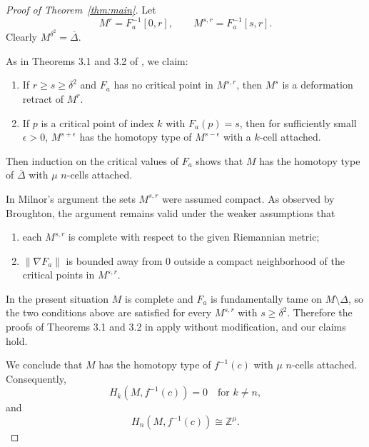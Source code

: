 \documentclass[11pt]{amsart}
\theoremstyle{plain}
\theoremstyle{definition}
\theoremstyle{remark}
\numberwithin{equation}{section}
\begin{document}
\begin{proof}[Proof of Theorem~\ref{thm:main}]
    Let
    \begin{equation}
        M^r = F_a^{-1}[0, r], \qquad M^{s,r} = F_a^{-1}[s, r].
    \end{equation}
    Clearly $M^{\delta^2} = \overline{\Delta}$.

    As in Theorems 3.1 and 3.2 of \cite{milnor1963morse}, we claim:
    \begin{enumerate}
        \item If $r \ge s \ge \delta^2$ and $F_a$ has no critical point in $M^{s,r}$, then $M^s$ is a deformation retract of $M^r$.
        \item If $p$ is a critical point of index $k$ with $F_a(p) = s$, then for sufficiently small $\epsilon > 0$, $M^{s+\epsilon}$ has the homotopy type of $M^{s-\epsilon}$ with a $k$-cell attached.
    \end{enumerate}
    Then induction on the critical values of $F_a$ shows that $M$ has the homotopy type of $\overline{\Delta}$ with $\mu$ $n$-cells attached.

    In Milnor's argument the sets $M^{s,r}$ were assumed compact.
    As observed by Broughton, the argument remains valid under the weaker assumptions that
    \begin{enumerate}
        \item each $M^{s,r}$ is complete with respect to the given Riemannian metric;
        \item $\|\nabla F_a\|$ is bounded away from $0$ outside a compact neighborhood of the critical points in $M^{s,r}$.
    \end{enumerate}
    In the present situation $M$ is complete and $F_a$ is fundamentally tame on $M \setminus \Delta$, so the two conditions above are satisfied for every $M^{s,r}$ with $s \ge \delta^2$.
    Therefore the proofs of Theorems 3.1 and 3.2 in \cite{milnor1963morse} apply without modification, and our claims hold.

    We conclude that $M$ has the homotopy type of $f^{-1}(c)$ with $\mu$ $n$-cells attached.
    Consequently,
    \begin{equation}
        H_k(M, f^{-1}(c)) = 0 \quad \text{for } k \neq n,
    \end{equation}
    and
    \begin{equation}
        H_n(M, f^{-1}(c)) \cong \mathbb{Z}^{\mu}.
    \end{equation}
\end{proof}
\end{document}

